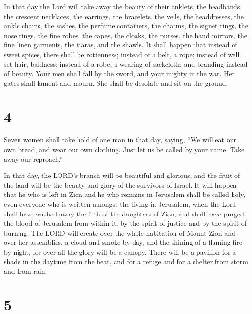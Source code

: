  In that day the Lord will take away the beauty of their
anklets, the headbands, the crescent necklaces,  the
earrings, the bracelets, the veils,  the headdresses, the
ankle chains, the sashes, the perfume containers, the charms,
 the signet rings, the nose rings,  the
fine robes, the capes, the cloaks, the purses,  the hand
mirrors, the fine linen garments, the tiaras, and the shawls.
 It shall happen that instead of sweet spices, there
shall be rottenness; instead of a belt, a rope; instead of well set
hair, baldness; instead of a robe, a wearing of sackcloth; and branding
instead of beauty.  Your men shall fall by the sword, and
your mighty in the war.  Her gates shall lament and
mourn. She shall be desolate and sit on the ground.

\hypertarget{section-3}{%
\section{4}\label{section-3}}

 Seven women shall take hold of one man in that day,
saying, ``We will eat our own bread, and wear our own clothing. Just let
us be called by your name. Take away our reproach.''

 In that day, the LORD's branch will be beautiful and
glorious, and the fruit of the land will be the beauty and glory of the
survivors of Israel.  It will happen that he who is left
in Zion and he who remains in Jerusalem shall be called holy, even
everyone who is written amongst the living in Jerusalem, 
when the Lord shall have washed away the filth of the daughters of Zion,
and shall have purged the blood of Jerusalem from within it, by the
spirit of justice and by the spirit of burning.  The LORD
will create over the whole habitation of Mount Zion and over her
assemblies, a cloud and smoke by day, and the shining of a flaming fire
by night, for over all the glory will be a canopy.  There
will be a pavilion for a shade in the daytime from the heat, and for a
refuge and for a shelter from storm and from rain.

\hypertarget{section-4}{%
\section{5}\label{section-4}}

